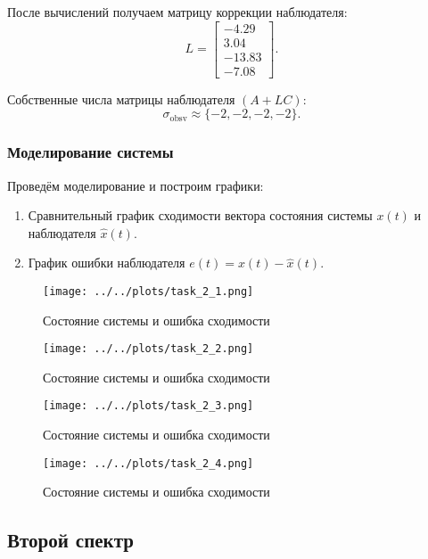 После вычислений получаем матрицу коррекции наблюдателя:
\[
L = \begin{bmatrix}
    -4.29 \\
    3.04 \\
    -13.83 \\
    -7.08
\end{bmatrix}.
\]

Собственные числа матрицы наблюдателя $(A + LC)$:
\[
\sigma_{\text{obsv}} \approx \{-2, -2, -2, -2\}.
\]

\subsubsection{Моделирование системы}

Проведём моделирование и построим графики:
\begin{enumerate}
    \item Сравнительный график сходимости вектора состояния системы $x(t)$ и наблюдателя $\hat{x}(t)$.
    \item График ошибки наблюдателя $e(t) = x(t) - \hat{x}(t)$.
\end{enumerate}

\begin{figure}[H]
    \centering
    \texttt{[image: ../../plots/task\_2\_1.png]}
    \caption{Состояние системы и ошибка сходимости}
    \label{fig:task_2_state_error_system_1_1}
\end{figure}

\begin{figure}[H]
    \centering
    \texttt{[image: ../../plots/task\_2\_2.png]}
    \caption{Состояние системы и ошибка сходимости}
    \label{fig:task_2_state_error_system_1_2}
\end{figure}

\begin{figure}[H]
    \centering
    \texttt{[image: ../../plots/task\_2\_3.png]}
    \caption{Состояние системы и ошибка сходимости}
    \label{fig:task_2_state_error_system_1_3}
\end{figure}

\begin{figure}[H]
    \centering
    \texttt{[image: ../../plots/task\_2\_4.png]}
    \caption{Состояние системы и ошибка сходимости}
    \label{fig:task_2_state_error_system_1_4}
\end{figure}


\subsection{Второй спектр}

